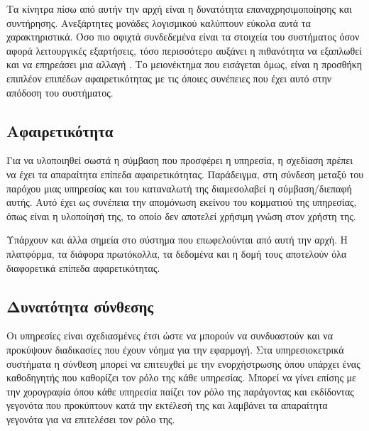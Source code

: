 Τα κίνητρα πίσω από αυτήν την αρχή είναι η δυνατότητα 
επαναχρησιμοποίησης και συντήρησης. Ανεξάρτητες μονάδες λογισμικού 
καλύπτουν εύκολα αυτά τα χαρακτηριστικά. Όσο πιο σφιχτά συνδεδεμένα 
είναι τα στοιχεία του συστήματος όσον αφορά λειτουργικές εξαρτήσεις, 
τόσο περισσότερο αυξάνει η πιθανότητα να εξαπλωθεί και να επηρεάσει μια 
αλλαγή \citep{Meyer1994}. Το μειονέκτημα που εισάγεται όμως, είναι η 
προσθήκη επιπλέον επιπέδων αφαιρετικότητας με τις όποιες συνέπειες που 
έχει αυτό στην απόδοση του συστήματος.

\subsection{Αφαιρετικότητα}

Για να υλοποιηθεί σωστά η σύμβαση που προσφέρει η υπηρεσία, η 
σχεδίαση πρέπει να έχει τα απαραίτητα επίπεδα αφαιρετικότητας. 
Παράδειγμα, στη σύνδεση μεταξύ του παρόχου μιας υπηρεσίας και του 
καταναλωτή της διαμεσολαβεί η σύμβαση/διεπαφή αυτής. Αυτό έχει ως 
συνέπεια την απομόνωση εκείνου του κομματιού της υπηρεσίας, όπως είναι η 
υλοποίησή της, το οποίο δεν αποτελεί χρήσιμη γνώση στον χρήστη της. 

Υπάρχουν και άλλα σημεία στο σύστημα που επωφελούνται από αυτή 
την αρχή. Η πλατφόρμα, τα διάφορα πρωτόκολλα, τα δεδομένα και η δομή 
τους αποτελούν όλα διαφορετικά επίπεδα αφαρετικότητας.

\subsection{Δυνατότητα σύνθεσης}

Οι υπηρεσίες είναι σχεδιασμένες έτσι ώστε να μπορούν να 
συνδυαστούν και να προκύψουν διαδικασίες που έχουν νόημα για την 
εφαρμογή. Στα υπηρεσιοκετρικά συστήματα η σύνθεση μπορεί να επιτευχθεί 
με την ενορχήστρωσης όπου υπάρχει ένας καθοδηγητής που καθορίζει τον 
ρόλο της κάθε υπηρεσίας. Μπορεί να γίνει επίσης με την χορογραφία όπου 
κάθε υπηρεσία παίζει τον ρόλο της παράγοντας και εκδίδοντας γεγονότα που 
προκύπτουν κατά την εκτέλεσή της και λαμβάνει τα απαραίτητα γεγονότα για 
να επιτελέσει τον ρόλο της.
